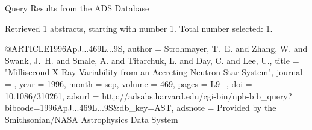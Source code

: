 Query Results from the ADS Database


Retrieved 1 abstracts, starting with number 1.  Total number selected: 1.

@ARTICLE{1996ApJ...469L...9S,
   author = {{Strohmayer}, T.~E. and {Zhang}, W. and {Swank}, J.~H. and {Smale}, A. and 
	{Titarchuk}, L. and {Day}, C. and {Lee}, U.},
    title = "{Millisecond X-Ray Variability from an Accreting Neutron Star System}",
  journal = {\apjl},
     year = 1996,
    month = sep,
   volume = 469,
    pages = {L9+},
      doi = {10.1086/310261},
   adsurl = {http://adsabs.harvard.edu/cgi-bin/nph-bib_query?bibcode=1996ApJ...469L...9S&db_key=AST},
  adsnote = {Provided by the Smithsonian/NASA Astrophysics Data System}
}


